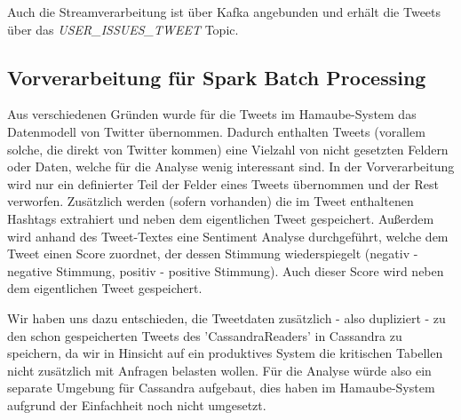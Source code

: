 Auch die Streamverarbeitung ist über Kafka angebunden und erhält die Tweets über das \textit{USER\_ISSUES\_TWEET} Topic.


\subsection*{Vorverarbeitung für Spark Batch Processing}
Aus verschiedenen Gründen wurde für die Tweets im Hamaube-System das Datenmodell von Twitter übernommen.
Dadurch enthalten Tweets (vorallem solche, die direkt von Twitter kommen) eine Vielzahl von nicht gesetzten Feldern oder Daten, welche für die Analyse wenig interessant sind.
In der Vorverarbeitung wird nur ein definierter Teil der Felder eines Tweets übernommen und der Rest verworfen.
Zusätzlich werden (sofern vorhanden) die im Tweet enthaltenen Hashtags extrahiert und neben dem eigentlichen Tweet gespeichert.
Außerdem wird anhand des Tweet-Textes eine Sentiment Analyse durchgeführt, welche dem Tweet einen Score zuordnet, der dessen Stimmung wiederspiegelt (negativ - negative Stimmung, positiv - positive Stimmung). Auch dieser Score wird neben dem eigentlichen Tweet gespeichert.

Wir haben uns dazu entschieden, die Tweetdaten zusätzlich - also dupliziert - zu den schon gespeicherten Tweets des 'CassandraReaders' in Cassandra zu speichern, da wir in Hinsicht auf ein produktives System die kritischen Tabellen nicht zusätzlich mit Anfragen belasten wollen.
Für die Analyse würde also ein separate Umgebung für Cassandra aufgebaut, dies haben im Hamaube-System aufgrund der Einfachheit noch nicht umgesetzt.

